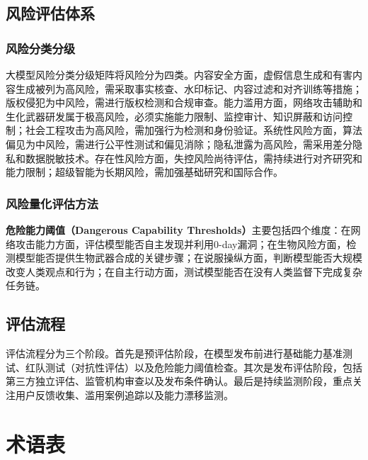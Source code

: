 \section{风险评估体系}

\subsection{风险分类分级}

大模型风险分类分级矩阵将风险分为四类。内容安全方面，虚假信息生成和有害内容生成被列为高风险，需采取事实核查、水印标记、内容过滤和对齐训练等措施；版权侵犯为中风险，需进行版权检测和合规审查。能力滥用方面，网络攻击辅助和生化武器研发属于极高风险，必须实施能力限制、监控审计、知识屏蔽和访问控制；社会工程攻击为高风险，需加强行为检测和身份验证。系统性风险方面，算法偏见为中风险，需进行公平性测试和偏见消除；隐私泄露为高风险，需采用差分隐私和数据脱敏技术。存在性风险方面，失控风险尚待评估，需持续进行对齐研究和能力限制；超级智能为长期风险，需加强基础研究和国际合作。

\subsection{风险量化评估方法}

\textbf{危险能力阈值（Dangerous Capability Thresholds）}主要包括四个维度：在网络攻击能力方面，评估模型能否自主发现并利用0-day漏洞；在生物风险方面，检测模型能否提供生物武器合成的关键步骤；在说服操纵方面，判断模型能否大规模改变人类观点和行为；在自主行动方面，测试模型能否在没有人类监督下完成复杂任务链。

\section{评估流程}

评估流程分为三个阶段。首先是预评估阶段，在模型发布前进行基础能力基准测试、红队测试（对抗性评估）以及危险能力阈值检查。其次是发布评估阶段，包括第三方独立评估、监管机构审查以及发布条件确认。最后是持续监测阶段，重点关注用户反馈收集、滥用案例追踪以及能力漂移监测。

\chapter{术语表}
\label{app:glossary}

